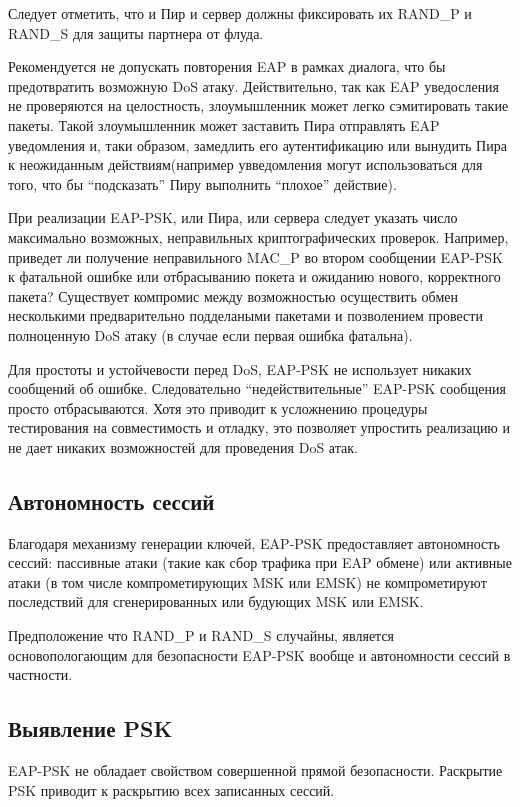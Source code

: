 Следует отметить, что и Пир и сервер должны фиксировать их RAND\_P и RAND\_S для защиты партнера от флуда.

Рекомендуется не допускать повторения EAP в рамках диалога, что бы предотвратить возможную DoS атаку. Действительно, так как EAP уведосления не проверяются на целостность, злоумышленник может легко сэмитировать такие пакеты. Такой злоумышленник может заставить Пира отправлять EAP уведомления и, таки образом, замедлить его аутентификацию или вынудить Пира к неожиданным действиям(например увведомления могут использоваться для того, что бы ``подсказать'' Пиру выполнить ``плохое'' действие).

При реализации EAP-PSK, или Пира, или сервера следует указать число максимально возможных, неправильных криптографических проверок. Например, приведет ли получение неправильного MAC\_P во втором сообщении EAP-PSK к фатальной ошибке или отбрасыванию покета и ожиданию нового, корректного пакета? Существует компромис между возможностью осуществить обмен несколькими предварительно подделаными пакетами и позволением провести полноценную DoS атаку (в случае если первая ошибка фатальна).

Для простоты и устойчевости перед DoS, EAP-PSK не использует никаких сообщений об ошибке. Следовательно ``недействительные'' EAP-PSK сообщения просто отбрасываются. Хотя это приводит к усложнению процедуры тестирования на совместимость и отладку, это позволяет упростить реализацию и не дает никаких возможностей для проведения DoS атак.

\subsection{Автономность сессий}

Благодаря механизму генерации ключей, EAP-PSK предоставляет автономность сессий: пассивные атаки (такие как сбор трафика при EAP обмене) или активные атаки (в том числе компрометирующих MSK или EMSK) не компрометируют последствий для сгенерированных или будующих MSK или EMSK.

Предположение что RAND\_P и RAND\_S случайны, является основопологающим для безопасности EAP-PSK вообще и автономности сессий в частности.

\subsection{Выявление PSK}

EAP-PSK не обладает свойством совершенной прямой безопасности. Раскрытие PSK приводит к раскрытию всех записанных сессий.

